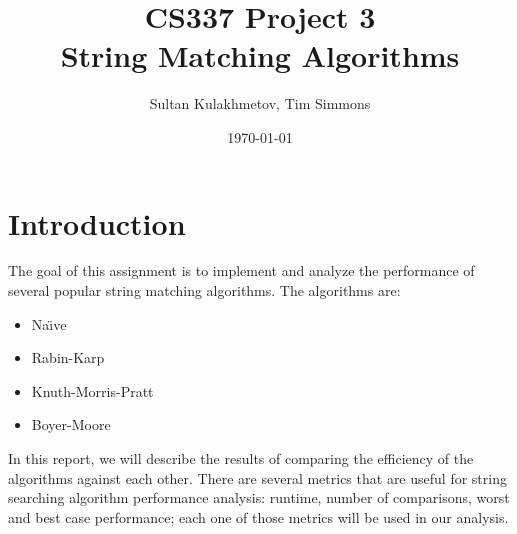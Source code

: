 \documentclass[11pt]{amsart}
\title{CS337 Project 3 \\ String Matching Algorithms}
\author{Sultan Kulakhmetov, Tim Simmons}
\date{\today}
\begin{document}
\maketitle
\section{Introduction}
The goal of this assignment is to implement and analyze the performance of
several popular string matching algorithms. The algorithms are:
\begin{itemize} 
\item Na\"{\i}ve
\item Rabin-Karp
\item Knuth-Morris-Pratt 
\item Boyer-Moore
\end{itemize}
In this report, we will describe the results of comparing the efficiency of the algorithms against each other. There are several metrics that are useful for string searching algorithm performance analysis: runtime, number of comparisons, worst and best case performance; each one of those metrics will be used in our analysis.
\end{document}
